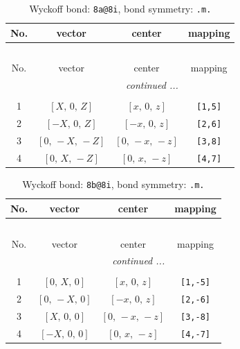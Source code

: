\documentclass[fleqn,8pt]{jsarticle}
\begin{document}
\begin{longtable}{cccc}
\caption{Wyckoff bond: {\tt 8a@8i}, bond symmetry: {\tt .m.}}
 \\
 \hline \hline
No. & vector & center & mapping \\ \hline \endfirsthead

\multicolumn{3}{l}{\tablename\ \thetable{}} \\
 \hline \hline
No. & vector & center & mapping \\ \hline \endhead

 \hline \hline
\multicolumn{3}{r}{\footnotesize\it continued ...} \\ \endfoot

 \hline \hline
\multicolumn{3}{r}{} \\ \endlastfoot

1 & $\left[ X,\, 0,\, Z \right]$ & $\left[ x,\, 0,\, z \right]$ & {\tt [1,5]} \\ \hline
2 & $\left[ - X,\, 0,\, Z \right]$ & $\left[ - x,\, 0,\, z \right]$ & {\tt [2,6]} \\ \hline
3 & $\left[ 0,\, - X,\, - Z \right]$ & $\left[ 0,\, - x,\, - z \right]$ & {\tt [3,8]} \\ \hline
4 & $\left[ 0,\, X,\, - Z \right]$ & $\left[ 0,\, x,\, - z \right]$ & {\tt [4,7]} \\
\end{longtable}
\renewcommand{\arraystretch}{1.2}
\begin{longtable}{cccc}
\caption{Wyckoff bond: {\tt 8b@8i}, bond symmetry: {\tt .m.}}
 \\
 \hline \hline
No. & vector & center & mapping \\ \hline \endfirsthead

\multicolumn{3}{l}{\tablename\ \thetable{}} \\
 \hline \hline
No. & vector & center & mapping \\ \hline \endhead

 \hline \hline
\multicolumn{3}{r}{\footnotesize\it continued ...} \\ \endfoot

 \hline \hline
\multicolumn{3}{r}{} \\ \endlastfoot

1 & $\left[ 0,\, X,\, 0 \right]$ & $\left[ x,\, 0,\, z \right]$ & {\tt [1,-5]} \\ \hline
2 & $\left[ 0,\, - X,\, 0 \right]$ & $\left[ - x,\, 0,\, z \right]$ & {\tt [2,-6]} \\ \hline
3 & $\left[ X,\, 0,\, 0 \right]$ & $\left[ 0,\, - x,\, - z \right]$ & {\tt [3,-8]} \\ \hline
4 & $\left[ - X,\, 0,\, 0 \right]$ & $\left[ 0,\, x,\, - z \right]$ & {\tt [4,-7]} \\
\end{longtable}
\end{document}
